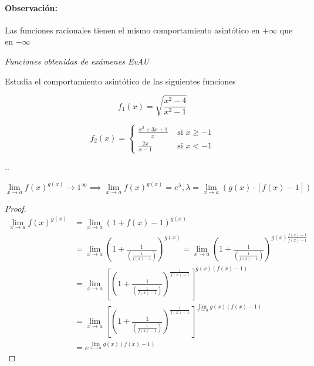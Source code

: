 \paragraph{Observación:} Las funciones racionales tienen el mismo comportamiento asintótico en $+\infty$ que en $-\infty$

\begin{problem}
\textit{Funciones obtenidas de exámenes EvAU}

Estudia el comportamiento asintótico de las siguientes funciones 

$$f_1(x) = \sqrt{\frac{x^2-4}{x^2-1}}$$

$$f_2(x) = \begin{cases}
\frac{x^2+3x+1}{x}&\text{ si }  x\geq -1\\
\frac{2x}{x-1}&\text{ si }  x< -1
\end{cases}
$$

\solution

.\vspace{15cm}.

\end{problem}

\begin{prop}
\[
\lim_{x\to a}f(x)^{g(x)} \to 1^{\infty} \implies \lim_{x\to a}f(x)^{g(x)} = e^\lambda, \lambda = \lim_{x\to a} \left(g(x)·[f(x)-1]\right)
\]
\end{prop}

\begin{proof}
\begin{align*}
\lim_{x\to a}f(x)^{g(x)} &= \lim_{x\to a}(1+f(x)-1)^{g(x)}
\\
&= \lim_{x\to a}\left(1+\frac{1}{\left(\frac{1}{f(x)-1}\right)}\right)^{g(x)}
= \lim_{x\to a}\left(1+\frac{1}{\left(\frac{1}{f(x)-1}\right)}\right)^{g(x)\frac{f(x)-1}{f(x)-1}}
\\
&= \lim_{x\to a}\left[\left(1+\frac{1}{\left(\frac{1}{f(x)-1}\right)}\right)^{\frac{1}{f(x)-1}}\right]^{g(x)(f(x)-1)}
\\
&= \lim_{x\to a}\left[\left(1+\frac{1}{\left(\frac{1}{f(x)-1}\right)}\right)^{\frac{1}{f(x)-1}}\right]^{\displaystyle\lim_{x\to a}g(x)(f(x)-1)} 
\\
&= e^{\displaystyle\lim_{x\to a}g(x)(f(x)-1)}
\end{align*}
\end{proof}

%

